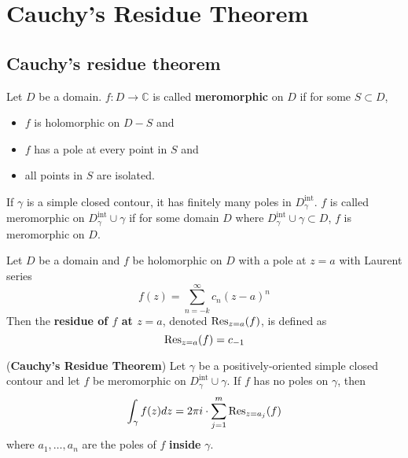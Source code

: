 \section{Cauchy's Residue Theorem}

\subsection{Cauchy's residue theorem}

\begin{definition}
	Let $D$ be a domain. $f: D \to \mathbb{C}$ is called \textbf{meromorphic} on $D$ if for some $S \subset D$,
	\begin{itemize}
		\item $f$ is holomorphic on $D - S$ and
		\item $f$ has a pole at every point in $S$ and
		\item all points in $S$ are isolated.
	\end{itemize}
\end{definition}

\begin{remark}
	If $\gamma$ is a simple closed contour, it has finitely many poles in $D_{\gamma}^{\text{int}}$. $f$ is called meromorphic on $D_{\gamma}^{\text{int}} \cup \gamma$ if for some domain $D$ where $D_{\gamma}^{\text{int}} \cup \gamma \subset D$, $f$ is meromorphic on $D$.
\end{remark}

\begin{definition}
	Let $D$ be a domain and $f$ be holomorphic on $D$ with a pole at $z = a$ with Laurent series
	\[
		f(z) = \sum_{n = -k}^{\infty} c_n {(z - a)}^n
	\]
	Then the \textbf{residue of $f$ at $z = a$}, denoted $\text{Res}_{z = a}(f)$, is defined as
	\[
		\text{Res}_{z = a}(f) = c_{-1}
	\]
\end{definition}

\begin{theorem}\label{thm:cauchysResidueTheorem}
	(\textbf{Cauchy's Residue Theorem}) Let $\gamma$ be a positively-oriented simple closed contour and let $f$ be meromorphic on 
	$D_{\gamma}^{\text{int}} \cup \gamma$. If $f$ has no poles on $\gamma$, then
	\[
		\int_{\gamma} f(z) dz = 2 \pi i \cdot \sum_{j = 1}^{m} \text{Res}_{z = a_j}(f)
	\]
	where $a_1, \dots, a_n$ are the poles of $f$ \textbf{inside} $\gamma$.
\end{theorem}

